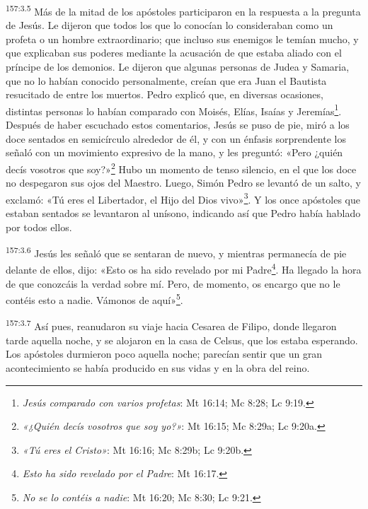 \par 
\textsuperscript{157:3.5} Más de la mitad de los apóstoles participaron en la respuesta a la pregunta de Jesús. Le dijeron que todos los que lo conocían lo consideraban como un profeta o un hombre extraordinario; que incluso sus enemigos le temían mucho, y que explicaban sus poderes mediante la acusación de que estaba aliado con el príncipe de los demonios. Le dijeron que algunas personas de Judea y Samaria, que no lo habían conocido personalmente, creían que era Juan el Bautista resucitado de entre los muertos. Pedro explicó que, en diversas ocasiones, distintas personas lo habían comparado con Moisés, Elías, Isaías y Jeremías\footnote{\textit{Jesús comparado con varios profetas}: Mt 16:14; Mc 8:28; Lc 9:19.}. Después de haber escuchado estos comentarios, Jesús se puso de pie, miró a los doce sentados en semicírculo alrededor de él, y con un énfasis sorprendente los señaló con un movimiento expresivo de la mano, y les preguntó: «Pero ¿quién decís vosotros que soy?»\footnote{\textit{«¿Quién decís vosotros que soy yo?»}: Mt 16:15; Mc 8:29a; Lc 9:20a.} Hubo un momento de tenso silencio, en el que los doce no despegaron sus ojos del Maestro. Luego, Simón Pedro se levantó de un salto, y exclamó: «Tú eres el Libertador, el Hijo del Dios vivo»\footnote{\textit{«Tú eres el Cristo»}: Mt 16:16; Mc 8:29b; Lc 9:20b.}. Y los once apóstoles que estaban sentados se levantaron al unísono, indicando así que Pedro había hablado por todos ellos.

\par 
\textsuperscript{157:3.6} Jesús les señaló que se sentaran de nuevo, y mientras permanecía de pie delante de ellos, dijo: «Esto os ha sido revelado por mi Padre\footnote{\textit{Esto ha sido revelado por el Padre}: Mt 16:17.}. Ha llegado la hora de que conozcáis la verdad sobre mí. Pero, de momento, os encargo que no le contéis esto a nadie. Vámonos de aquí»\footnote{\textit{No se lo contéis a nadie}: Mt 16:20; Mc 8:30; Lc 9:21.}.

\par 
\textsuperscript{157:3.7} Así pues, reanudaron su viaje hacia Cesarea de Filipo, donde llegaron tarde aquella noche, y se alojaron en la casa de Celsus, que los estaba esperando. Los apóstoles durmieron poco aquella noche; parecían sentir que un gran acontecimiento se había producido en sus vidas y en la obra del reino.

